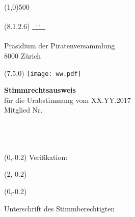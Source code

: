 \documentclass[11pt, a4paper]{scrartcl}
\begin{document}
{\begin{minipage}[t][13.42cm][t]{\textwidth}
\end{minipage}

\line(1,0){500}
\vspace{1cm}

\begin{minipage}[t][12.5cm][t]{\textwidth}

\begin{textblock}{9}(8.1,2.6)
\underline{\textsuperscript*{ \givenname~\surname, \street, \postalcode~\location }} \\
\vspace{-0.3cm} \\
Präsidium der Piratenversammlung \\
8000 Zürich
\end{textblock}

\begin{textblock}{6}(7.5,0)
\texttt{[image: ww.pdf]}
\end{textblock}

{\LARGE\textbf{Stimmrechtsausweis}} \\
für die Urabstimmung vom XX.YY.2017 \\

Mitglied Nr. \textbf{\id}   \\
\givenname~\surname         \\
\street                     \\
\postalcode~\location       \\
%

\begin{textblock}{6}(0,-0.2)
Verifikation:
\end{textblock}

\begin{textblock}{4}(2,-0.2)
\raggedright
\textbf{\code}
\end{textblock}

\vspace{4cm}

\begin{textblock}{6}(0,-0.2)
\begin{framed}
Unterschrift des Stimmberechtigten \\
\vspace{1.5cm} ~ \\
\end{framed}
\end{textblock}


\end{minipage}}
\end{document}
